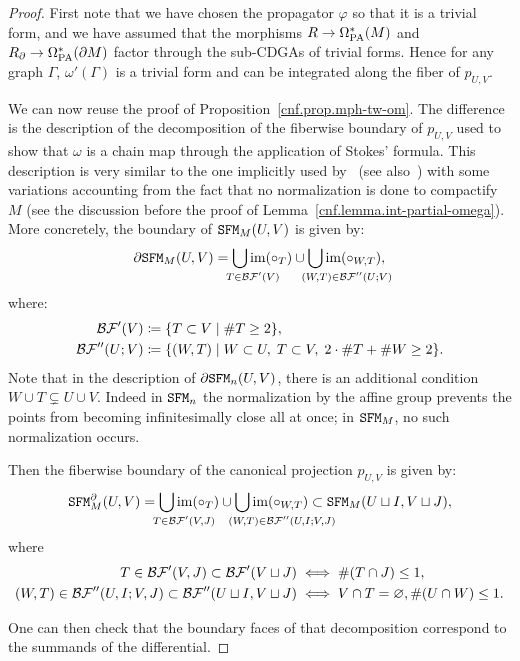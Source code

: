 \begin{proof}
    First note that we have chosen the propagator $\varphi$ so that it is a trivial form, and we have assumed that the morphisms $R \to \Omega_{\mathrm{PA}}^{*}(M)$ and $R_{\partial} \to \Omega_{\mathrm{PA}}^{*}(\partial M)$ factor through the sub-CDGAs of trivial forms.
  Hence for any graph $\Gamma$, $\omega'(\Gamma)$ is a trivial form and can be integrated along the fiber of $p_{U,V}$.

  We can now reuse the proof of Proposition~\ref{cnf.prop.mph-tw-om}.
  The difference is the description of the decomposition of the fiberwise boundary of $p_{U,V}$ used to show that $\omega$ is a chain map through the application of Stokes' formula.
  This description is very similar to the one implicitly used by~\cite{Willwacher2015a} (see also~\cite[Section~5.2.1]{Kontsevich2003}) with some variations accounting from the fact that no normalization is done to compactify $M$ (see the discussion before the proof of Lemma~\ref{cnf.lemma.int-partial-omega}).
  More concretely, the boundary of $\mathtt{SFM}_{M}(U,V)$ is given by:
  \[ \partial \SFM_{M}(U,V) = \bigcup_{\hspace{-2em} \mathrlap{T \in \BF'(V)}} \im (\circ_{T}) \cup \bigcup_{\hspace{-2em} \mathrlap{(W,T) \in \BF''(U;V)}} \im (\circ_{W,T}), \]
  where:
  \begin{align*}
    \mathcal{BF}'(V) & \coloneqq \{ T \subset V \mid \# T \geq 2 \}, \\
    \mathcal{BF}''(U;V) & \coloneqq \{ (W,T) \mid W \subset U, \; T \subset V, \; 2 \cdot \#T + \#W \geq 2 \}.
  \end{align*}
  Note that in the description of $\partial \mathtt{SFM}_{n}(U,V)$, there is an additional condition $W \cup T \subsetneq U \cup V$.
  Indeed in $\mathtt{SFM}_{n}$ the normalization by the affine group prevents the points from becoming infinitesimally close all at once; in $\mathtt{SFM}_{M}$, no such normalization occurs.

  Then the fiberwise boundary of the canonical projection $p_{U,V}$ is given by:
  \[ \SFM^{\partial}_{M}(U,V) =  \bigcup_{\hspace{-2em} \mathrlap{T \in \BF'(V,J)}} \im (\circ_{T}) \cup \bigcup_{\hspace{-2em} \mathrlap{(W,T) \in \BF''(U, I; V, J)}} \im (\circ_{W,T}) \subset \SFM_{M}(U \sqcup I, V \sqcup J), \]
  where
  \begin{align*}
    T \in \mathcal{BF}'(V,J) \subset \mathcal{BF}'(V \sqcup J) & \iff \#(T \cap J) \leq 1, \\
    (W,T) \in \mathcal{BF}''(U,I; V,J) \subset \mathcal{BF}''(U \sqcup I, V \sqcup J) & \iff V \cap T = \varnothing, \#(U \cap W) \leq 1.
  \end{align*}

  One can then check that the boundary faces of that decomposition correspond to the summands of the differential.
\end{proof}

